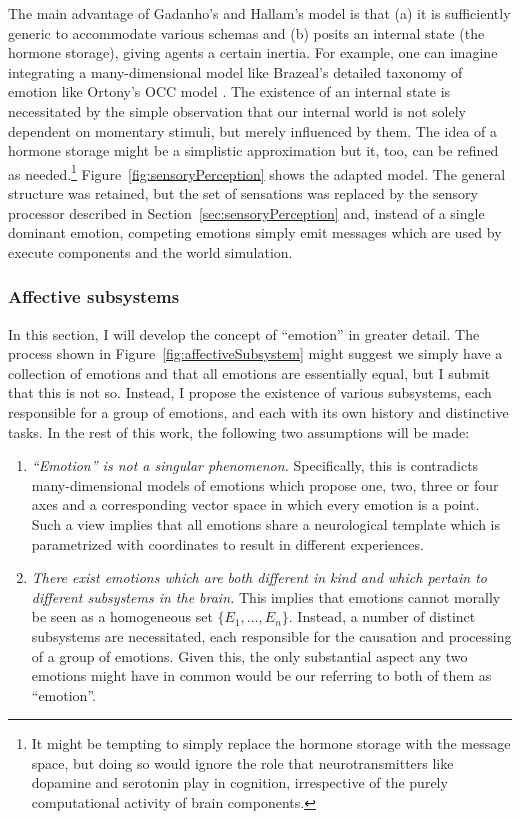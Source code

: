 \documentclass[]{scrartcl}
\theoremstyle{break}
\begin{document}
\pagebreak
The main advantage of Gadanho's and Hallam's model is that (a) it is sufficiently generic to accommodate various schemas and (b) posits an internal state (the hormone storage), giving agents a certain inertia. For example, one can imagine integrating a many-dimensional model like Brazeal's \cite{breazeal2003} detailed taxonomy of emotion like Ortony's OCC model \cite{ortony1988}. The existence of an internal state is necessitated by the simple observation that our internal world is not solely dependent on momentary stimuli, but merely influenced by them. The idea of a hormone storage might be a simplistic approximation but it, too, can be refined as needed.\footnote{It might be tempting to simply replace the hormone storage with the message space, but doing so would ignore the role that neurotransmitters like dopamine and serotonin play in cognition, irrespective of the purely computational activity of brain components.} Figure~\ref{fig:sensoryPerception} shows the adapted model. The general structure was retained, but the set of sensations was replaced by the sensory processor described in Section~\ref{sec:sensoryPerception} and, instead of a single dominant emotion, competing emotions simply emit messages which are used by execute components and the world simulation.

\subsubsection{Affective subsystems}

In this section, I will develop the concept of ``emotion'' in greater detail. The process shown in Figure~\ref{fig:affectiveSubsystem} might suggest we simply have a collection of emotions and that all emotions are essentially equal, but I submit that this is not so. Instead, I propose the existence of various subsystems, each responsible for a group of emotions, and each with its own history and distinctive tasks. In the rest of this work, the following two assumptions will be made:

\begin{enumerate}
	\item {\em ``Emotion'' is not a singular phenomenon.} Specifically, this is contradicts many-dimensional models of emotions which propose one, two, three or four axes and a corresponding vector space in which every emotion is a point. Such a view implies that all emotions share a neurological template which is parametrized with coordinates to result in different experiences.
	\item {\em There exist emotions which are both different in kind and which pertain to different subsystems in the brain.} This implies that emotions cannot morally be seen as a homogeneous set $\{E_1,\dots,E_n\}$. Instead, a number of distinct subsystems are necessitated, each responsible for the causation and processing of a group of emotions. Given this, the only substantial aspect any two emotions might have in common would be our referring to both of them as ``emotion''.
\end{enumerate}
\end{document}
